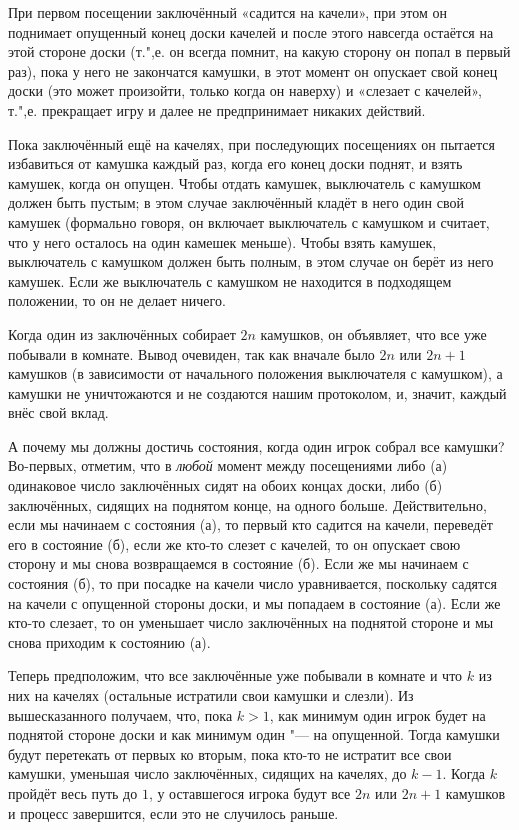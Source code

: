 \documentclass[twoside]{book}
\begin{document}
При первом посещении заключённый «садится на качели», при этом он поднимает опущенный конец доски качелей и
после этого навсегда остаётся на этой стороне доски (т.",е. он всегда помнит, на какую сторону он попал в первый раз), пока у него не закончатся камушки, в этот момент он опускает свой конец доски (это может произойти, только когда он наверху) и «слезает с качелей», т.",е. прекращает игру и далее не предпринимает никаких действий.

Пока заключённый ещё на качелях,
при последующих посещениях он пытается избавиться от камушка каждый раз, когда его конец доски поднят,
и взять камушек, когда он опущен.
Чтобы отдать камушек, выключатель с камушком должен быть пустым;
в этом случае заключённый 
кладёт в него один свой камушек (формально говоря, он включает выключатель с камушком и считает, что у него осталось на один камешек меньше).
Чтобы взять камушек, выключатель с камушком должен быть полным, в этом случае он берёт из него камушек.
Если же выключатель с камушком не находится в подходящем положении, то он не делает ничего.

Когда один из заключённых собирает $2n$ камушков, он объявляет, что все уже побывали в комнате.
Вывод очевиден, так как вначале было $2n$ или $2n+1$ камушков (в зависимости от начального положения выключателя с камушком), а камушки не уничтожаются и не создаются нашим протоколом, и, значит, каждый внёс свой вклад.

А почему мы должны достичь состояния, когда один игрок собрал все камушки?
Во-первых, отметим, что в \emph{любой} момент между посещениями либо 
(а) одинаковое число заключённых сидят на обоих концах доски, либо 
(б) заключённых, сидящих на поднятом конце, на одного больше.
Действительно, если мы начинаем с состояния (а), то первый кто садится на качели, переведёт его в состояние (б), если же кто-то слезет с качелей, то он опускает свою сторону и мы  снова возвращаемся в состояние (б).
Если же мы начинаем с состояния (б), то при посадке на качели число уравнивается, поскольку садятся на качели с опущенной стороны доски, и мы попадаем в состояние (а).
Если же кто-то слезает, то он уменьшает число заключённых на поднятой стороне и мы снова приходим к состоянию (а).

Теперь предположим, что все заключённые уже побывали в комнате и что $k$ из них на качелях (остальные истратили свои камушки и слезли).
Из вышесказанного получаем, что, пока $k>1$, как минимум один игрок будет на поднятой стороне доски и как минимум один "--- на опущенной.
Тогда камушки будут перетекать от первых ко вторым, пока кто-то не истратит все свои камушки, уменьшая число заключённых, сидящих на качелях, до $k-1$.
Когда $k$ пройдёт весь путь до $1$, у оставшегося игрока будут все $2n$ или $2n+1$ камушков и процесс завершится, если это не случилось раньше.
\heart
\end{document}

